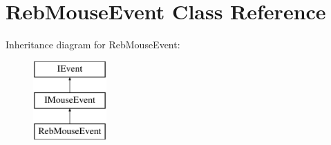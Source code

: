 \hypertarget{class_reb_mouse_event}{}\section{Reb\+Mouse\+Event Class Reference}
\label{class_reb_mouse_event}
Inheritance diagram for Reb\+Mouse\+Event\+:\begin{figure}[H]
\begin{center}
\leavevmode
\includegraphics[height=3.000000cm]{class_reb_mouse_event}
\end{center}
\end{figure}
